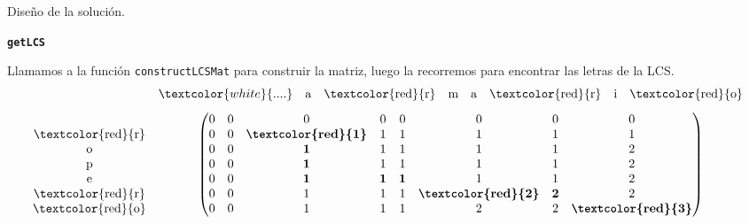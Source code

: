 \documentclass[10pt, xcolor=table]{beamer}
\begin{document}
\begin{frame}[fragile]{Diseño de la solución. }
\begin{center}
	\textbf{\large{\texttt{getLCS}}}
\end{center}
Llamamos a la función \texttt{constructLCSMat} para construir la matriz, luego la recorremos para encontrar las letras de la LCS.
$$
\begin{matrix}
 & \begin{matrix} \textcolor{white}{....}\vspace{0.3cm}&\text{{a}} & \text{\textcolor{red}{r}} & \text{{m}} & \text{{a}} & \text{\textcolor{red}{r}} & \text{{i}} & \text{\textcolor{red}{o}} \end{matrix} \\
\begin{matrix}\\ \text{\textcolor{red}{r}}\\\text{{o}}\\\text{{p}}\\\text{{e}}\\\text{\textcolor{red}{r}}\\\text{{\textcolor{red}{o}}} \end{matrix} & \left(\begin{matrix}
0 & 0 & 0 &0&0&0&0&0\\
0&0&\textbf{\textcolor{red}{1}}&1&1&1&1&1\\
0&0&\textbf{1}&1&1&1&1&2\\
0&0&\textbf{1}&1&1&1&1&2\\
0&0&\textbf{1}&\textbf{1}&\textbf{1}&1&1&2\\
0&0&1&1&1&\textbf{\textcolor{red}{2}}&\textbf{2}&2\\
0&0&1&1&1&2&2&\textbf{\textcolor{red}{3}}\\
\end{matrix}\right)
\end{matrix}
$$
\end{frame}
\end{document}
